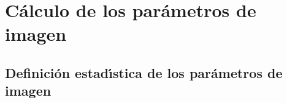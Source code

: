 
\chapter{C\'alculo de los par\'ametros de imagen}
\label{appendix:image}

\section{Definici\'on estad\'\i stica de los par\'ametros de imagen}

